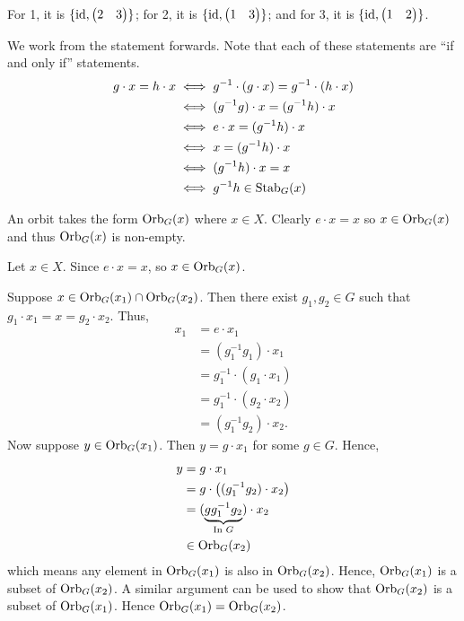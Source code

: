 \begin{questions}
    \item For 1, it is $\{\mathrm{id}, \begin{pmatrix}2 & 3\end{pmatrix}\}$; for 2, it is $\{\mathrm{id}, \begin{pmatrix}1 & 3\end{pmatrix}\}$; and for 3, it is $\{\mathrm{id}, \begin{pmatrix}1 & 2\end{pmatrix}\}$.

    \item We work from the statement forwards. Note that each of these statements are ``if and only if'' statements.
    \begin{align*}
        g \cdot x = h \cdot x &\iff g^{-1} \cdot (g \cdot x) = g^{-1} \cdot (h \cdot x)\\
        &\iff (g^{-1}g) \cdot x = (g^{-1}h) \cdot x\\
        &\iff e \cdot x = (g^{-1}h) \cdot x\\
        &\iff x = (g^{-1}h) \cdot x\\
        &\iff (g^{-1}h) \cdot x = x\\
        &\iff g^{-1}h \in \mathrm{Stab}_{G}(x)
    \end{align*}

    \item \begin{partquestions}{\alph*}
        \item An orbit takes the form $\mathrm{Orb}_{G}(x)$ where $x \in X$. Clearly $e \cdot x = x$ so $x \in \mathrm{Orb}_{G}(x)$ and thus $\mathrm{Orb}_{G}(x)$ is non-empty.
        \item Let $x \in X$. Since $e \cdot x = x$, so $x \in \mathrm{Orb}_{G}(x)$.
        \item Suppose $x \in \mathrm{Orb}_{G}(x_1) \cap \mathrm{Orb}_{G}(x_2)$. Then there exist $g_1, g_2 \in G$ such that $g_1\cdot x_1 = x = g_2\cdot x_2$. Thus,
        \begin{align*}
            x_1 &= e \cdot x_1\\
            &= (g_1^{-1}g_1)\cdot x_1\\
            &= g_1^{-1} \cdot (g_1 \cdot x_1)\\
            &= g_1^{-1} \cdot (g_2 \cdot x_2)\\
            &= (g_1^{-1}g_2) \cdot x_2.
        \end{align*}
        Now suppose $y \in \mathrm{Orb}_{G}(x_1)$. Then $y = g\cdot x_1$ for some $g \in G$. Hence,
        \begin{align*}
            y &= g\cdot x_1 \\
            &= g \cdot \left((g_1^{-1}g_2) \cdot x_2\right)\\
            &= (\underbrace{gg_1^{-1}g_2}_{\text{In } G})\cdot x_2\\
            &\in \mathrm{Orb}_{G}(x_2)
        \end{align*}
        which means any element in $\mathrm{Orb}_{G}(x_1)$ is also in $\mathrm{Orb}_{G}(x_2)$. Hence, $\mathrm{Orb}_{G}(x_1)$ is a subset of $\mathrm{Orb}_{G}(x_2)$. A similar argument can be used to show that $\mathrm{Orb}_{G}(x_2)$ is a subset of $\mathrm{Orb}_{G}(x_1)$. Hence $\mathrm{Orb}_{G}(x_1) = \mathrm{Orb}_{G}(x_2)$.
    \end{partquestions}


\end{questions}
